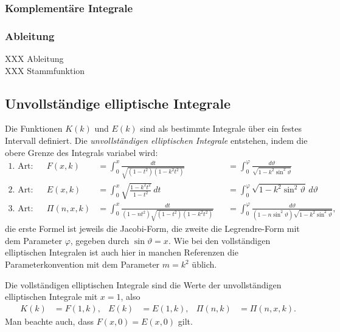 \subsubsection{Komplementäre Integrale}

\subsubsection{Ableitung}
XXX Ableitung \\
XXX Stammfunktion \\

\subsection{Unvollständige elliptische Integrale}
Die Funktionen $K(k)$ und $E(k)$ sind als bestimmte Integrale über ein
festes Intervall definiert.
Die {\em unvollständigen elliptischen Integrale} entstehen, indem die
%
obere Grenze des Integrals variabel wird:
\[
\begin{aligned}
\text{1.~Art:}&&
F(x,k)
&=
\int_0^x \frac{dt}{\sqrt{(1-t^2)(1-k^2t^2)}}
&&=
\int_0^\varphi \frac{d\vartheta}{\sqrt{1-k^2\sin^2\vartheta}}
\\
\text{2.~Art:}&&
E(x,k)
&=
\int_0^x \sqrt{\frac{1-k^2t^2}{1-t^2}}\,dt
&&=
\int_0^\varphi \sqrt{1-k^2\sin^2\vartheta}\,d\vartheta
\\
\text{3.~Art:}&&
\Pi(n,x,k)
&=
\int_0^x \frac{dt}{(1-nt^2)\sqrt{(1-t^2)(1-k^2t^2)}}
&&=
\int_0^\varphi
\frac{d\vartheta}{(1-n\sin^2\vartheta)\sqrt{1-k^2\sin^2\vartheta}},
\end{aligned}
\]
die erste Formel ist jeweils die Jacobi-Form, die zweite die Legrendre-Form
%
%
mit dem Parameter $\varphi$, gegeben durch
$\sin \vartheta=x$.
Wie bei den vollständigen elliptischen Integralen ist auch hier in manchen
Referenzen die Parameterkonvention mit dem Parameter $m=k^2$ üblich.

Die vollständigen elliptischen Integrale sind die Werte der 
unvollständigen elliptischen Integrale mit $x=1$, also
\begin{align*}
K(k) &= F(1,k),
&
E(k) &= E(1,k),
&
\Pi(n,k) &=\Pi(n,x,k).
\end{align*}
Man beachte auch, dass $F(x,0) = E(x,0)$ gilt.

